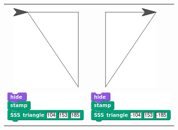 \documentclass[noauthor,nooutcomes,12pt,hints]{ximera}
\begin{document}
\begin{question}
\begin{freeResponse}
\begin{center}
\begin{tabular}{|c||c|}
      \hline\hline
      &  \\
      \includegraphics{SSSstampStageIII.png} & \includegraphics{SSSstampStageIV.png} \\
      \includegraphics{SSSstampScriptIII.png} & \includegraphics{SSSstampScriptIV.png} \\\hline
    \end{tabular}
  \end{center}
  \end{freeResponse}
\end{question}
\mynewpage
\end{document}
